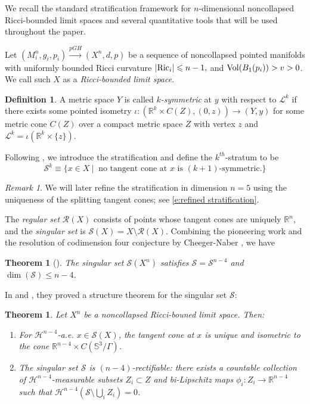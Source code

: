 \documentclass[11pt,reqno]{amsart}
\numberwithin{equation}{section}
\newcommand{\RR}{\mathds{R}}
\newcommand{\Ric}{{\rm Ric}}
\newcommand{\Vol}{{\rm Vol}}
\newcommand{\cH}{\mathcal{H}}
\newcommand{\cL}{\mathcal{L}}
\newcommand{\cR}{\mathcal{R}}
\newcommand{\cS}{\mathcal{S}}
\newtheorem{theorem}[thm]{Theorem}
\theoremstyle{definition}
\newtheorem{definition}[thm]{Definition}
\theoremstyle{remark}
\newtheorem{remark}[thm]{Remark}
\begin{document}
We recall the standard stratification framework for $n$-dimensional noncollapsed Ricci-bounded limit spaces and several quantitative tools that will be used throughout the paper. 

Let $(M^n_i, g_i, p_i) \xrightarrow{pGH} (X^n,d,p)$ be a sequence of noncollapsed pointed manifolds with uniformly bounded Ricci curvature $|\Ric_i | \leqslant n-1,$ and $\Vol(B_1(p_i)) > v >0$. We call such $X$ as a \textit{Ricci-bounded limit space}. 


\begin{definition}
    A metric space $Y$ is called \emph{$k$-symmetric} at $y$ with respect to $\cL^k$ if there exists some pointed isometry $\iota: (\RR^k \times C(Z), (0,z)) \to (Y,y)$ for some metric cone $C(Z)$ over a compact metric space $Z$ with vertex $z$ and $\cL^k = \iota(\RR^k \times \{z\})$.
\end{definition}

Following \cite{cc97}, we introduce the stratification and define the $k^{th}$-stratum to be 
\begin{equation*}
    \cS^k \equiv \{ x\in X ~|~ \text{ no tangent cone at } x \text{ is } (k+1) \text{-symmetric}. \}
\end{equation*}

\begin{remark}
    We will later refine the stratification in dimension $n=5$ using the uniqueness of the splitting tangent cones; see \eqref{e:refined stratification}. 
\end{remark}

The \emph{regular set} $\cR(X)$ consists of points whose tangent cones are uniquely $\mathbb{R}^n$, and the \emph{singular set} is $\cS(X)=X\setminus \cR(X)$. Combining the pioneering work \cite{col, cc97} and the resolution of codimension four conjecture by Cheeger-Naber \cite{cn}, we have 
\begin{theorem}[\cite{cn}]\label{t:codim four}
    The singular set $\cS(X^n)$ satisfies $\cS = \cS^{n-4}$ and $\dim(\cS) \leqslant n-4$. 
\end{theorem}

In \cite{cjn} and \cite{jn}, they proved a structure theorem for the singular set $\cS$:

\begin{theorem}\cite{cjn,jn}\label{t:cjn}
Let $X^n$ be a noncollapsed Ricci-bouned limit space. Then:
\begin{enumerate}
    \item For \emph{$\cH^{n-4}$-a.e.} $x \in \cS(X)$, the tangent cone at $x$ is \emph{unique} and isometric to the cone $\RR^{n-4} \times C(\mathbb{S}^3/\Gamma)$.
    \item The singular set $\cS$ is \emph{$(n-4)$-rectifiable}: there exists a countable collection of $\cH^{n-4}$-measurable subsets $Z_i \subset Z$ and bi-Lipschitz maps $\phi_i : Z_i \to \RR^{n-4}$ such that $\cH^{n-4}(\cS \setminus \bigcup_i Z_i)=0$.
\end{enumerate}
\end{theorem}
\end{document}
